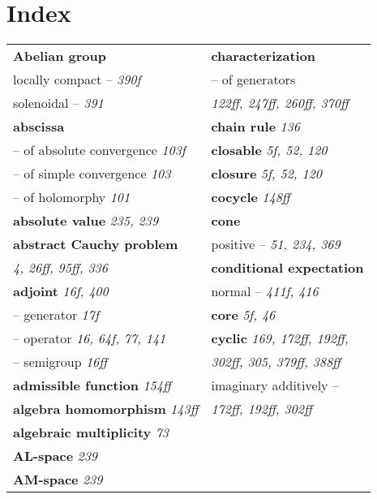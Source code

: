 \setcounter{chapter}{1}
\renewcommand\thepart{}
\renewcommand\thechapter{}
\chapter*{Index}
\begin{longtable}{p{}p{}}
\textbf{Abelian group} & \textbf{characterization} \\
\quad locally compact -- \textit{390f} & \quad -- of generators \\
\quad solenoidal -- \textit{391} & \quad\quad \textit{122ff, 247ff, 260ff, 370ff} \\
\textbf{abscissa} & \textbf{chain rule} \textit{136} \\
\quad -- of absolute convergence \textit{103f} & \textbf{closable} \textit{5f, 52, 120} \\
\quad -- of simple convergence \textit{103} & \textbf{closure} \textit{5f, 52, 120} \\
\quad -- of holomorphy \textit{101} & \textbf{cocycle} \textit{148ff} \\
\textbf{absolute value} \textit{235, 239} & \textbf{cone} \\
\textbf{abstract Cauchy problem} & \quad positive -- \textit{51, 234, 369} \\
\quad \textit{4, 26ff, 95ff, 336} & \textbf{conditional expectation} \\
\textbf{adjoint} \textit{16f, 400} & \quad normal -- \textit{411f, 416} \\
\quad -- generator \textit{17f} & \textbf{core} \textit{5f, 46} \\
\quad -- operator \textit{16, 64f, 77, 141} & \textbf{cyclic} \textit{169, 172ff, 192ff,} \\
\quad -- semigroup \textit{16ff} & \quad\quad \textit{302ff, 305, 379ff, 388ff} \\
\textbf{admissible function} \textit{154ff} & \quad imaginary additively -- \\
\textbf{algebra homomorphism} \textit{143ff} & \quad\quad \textit{172ff, 192ff, 302ff} \\
\textbf{algebraic multiplicity} \textit{73} & \\
\textbf{AL-space} \textit{239} & \\
\textbf{AM-space} \textit{239} & \\

\end{longtable}
